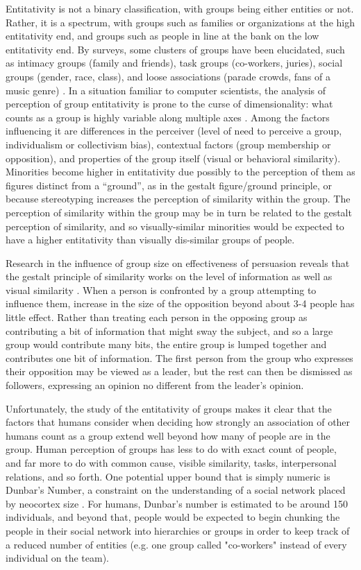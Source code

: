 Entitativity is not a binary classification, with groups being either entities or not. 
Rather, it is a spectrum, with groups such as families or organizations at the high entitativity end, and groups such as people in line at the bank on the low entitativity end. 
By surveys, some clusters of groups have been elucidated, such as intimacy groups (family and friends), task groups (co-workers, juries), social groups (gender, race, class), and loose associations (parade crowds, fans of a music genre) \citep{lickel2001elements}. 
In a situation familiar to computer scientists, the analysis of perception of group entitativity is prone to the curse of dimensionality: what counts as a group is highly variable along multiple axes \citep{lickel2000varieties}.  
Among the factors influencing it are differences in the perceiver (level of need to perceive a group, individualism or collectivism bias), contextual factors (group membership or opposition), and properties of the group itself (visual or behavioral similarity).
Minorities become higher in entitativity due possibly to the perception of them as figures distinct from a ``ground'', as in the gestalt figure/ground principle, or because stereotyping increases the perception of similarity within the group. 
The perception of similarity within the group may be in turn be related to the gestalt perception of similarity, and so visually-similar minorities would be expected to have a higher entitativity than visually dis-similar groups of people. 
	
Research in the influence of group size on effectiveness of persuasion reveals that the gestalt principle of similarity works on the level of information as well as visual similarity \citep{wilder1977perception}. 
When a person is confronted by a group attempting to influence them, increase in the size of the opposition beyond about 3-4 people has little effect. 
Rather than treating each person in the opposing group as contributing a bit of information that might sway the subject, and so a large group would contribute many bits, the entire group is lumped together and contributes one bit of information. 
The first person from the group who expresses their opposition may be viewed as a leader, but the rest can then be dismissed as followers, expressing an opinion no different from the leader's opinion. 

Unfortunately, the study of the entitativity of groups makes it clear that the factors that humans consider when deciding how strongly an association of other humans count as a group extend well beyond how many of people are in the group.
Human perception of groups has less to do with exact count of people, and far more to do with common cause, visible similarity, tasks, interpersonal relations, and so forth. 
One potential upper bound that is simply numeric is Dunbar's Number, a constraint on the understanding of a social network placed by neocortex size \citep{dunbar1992neocortex}. 
For humans, Dunbar's number is estimated to be around 150 individuals, and beyond that, people would be expected to begin chunking the people in their social network into hierarchies or groups in order to keep track of a reduced number of entities (e.g. one group called "co-workers" instead of every individual on the team). 

